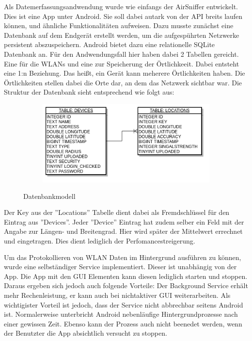 \documentclass[11pt,a4paper]{article}
\begin{document}
Als Datemerfassungsandwendung wurde wie einfangs der AirSniffer entwickelt. Dies ist eine App unter Android. Sie soll dabei autark von der API breits laufen können, und ähnliche Funktionalitäten aufweisen. Dazu musste zunächst eine Datenbank auf dem Endgerät erstellt werden, um die aufgespührten Netzwerke persistent abszuspeichern. Android bietet dazu eine relationelle SQLite Datenbank an. Für den Andwendungsfall hier haben dabei 2 Tabellen gereicht. Eine für die WLANs und eine zur Speicherung der Örtlichkeeit. Dabei entsteht eine 1:n Beziehung. Das heißt, ein Gerät kann meherere Örtlichkeiten haben. Die Örtlichkeiten stellen dabei die Orte dar, an dem das Netzwerk sichtbar war. Die  Struktur der Datenbank sieht entsprechend wie folgt aus:

\begin{figure}[htbp]
    \centering
    \begin{subfigure}[b]{1\textwidth}
        \includegraphics[width=\textwidth]{pics/dbView.png}
    \end{subfigure}
    \caption{Datenbankmodell}\label{fig:DB_VIEW}
\end{figure}

Der Key aus der ''Locations'' Tabelle dient dabei als Fremdschlüssel für den Eintrag aus ''Devices''. Jeder ''Device'' Eintrag hat zudem selber ein Feld mit der Angabe zur Längen- und Breitengrad. Hier wird später der Mittelwert errechnet und eingetragen. Dies dient lediglich der Perfomancestreigerung. 

Um das Protokollieren von WLAN Daten im Hintergrund ausführen zu können, wurde eine selbständiger Service implementiert. Dieser ist unabhängig von der App. Die App mit den GUI Elementen kann diesen lediglich starten und stoppen. Daraus ergeben sich jedoch auch folgende Vorteile: Der Background Service erhält mehr Rechenleistung, er kann auch bei nichtaktiver GUI weiterarbeiten. Als wichtigister Vorteil ist jedoch, dass der Service nicht abbrechbar seitens Android ist. Normalerweise unterbricht Android nebenläufige Hintergrundprozesse nach einer gewissen Zeit. Ebenso kann der Prozess auch nicht beenedet werden, wenn der Benutzter die App absichtlich versucht zu stoppen. 
\end{document}
